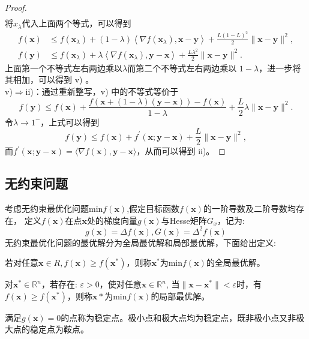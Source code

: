 \begin{proof}
\begin{equation}
\begin{array}{l}
\end{array}
    \nonumber
\end{equation}
将$x_{\lambda}  $代入上面两个等式，可以得到
\begin{equation}
\begin{array}{c}
f(\bm{x}) &\leq f\left(\bm{x}_{\lambda}\right)+(1-\lambda)\left\langle\nabla f\left(\bm{x}_{\lambda}\right), \bm{x}-\bm{y}\right\rangle+\frac{L(1-L)^{2}}{2}\|\bm{x}-\bm{y}\|^{2} , \\
f(\bm{y}) &\leq f\left(\bm{x}_{\lambda}\right)+\lambda\left\langle\nabla f\left(\bm{x}_{\lambda}\right), \bm{y}-\bm{x}\right\rangle+\frac{L \lambda^{2}}{2}\|\bm{x}-\bm{y}\|^{2} .
\end{array}
    \nonumber
\end{equation}
上面第一个不等式左右两边乘以$  \lambda  $而第二个不等式左右两边乘以  $1-\lambda $，进一步将其相加，可以得到 v)  。\\
v)$ \Rightarrow $ii)：通过重新整写，v) 中的不等式等价于
\begin{equation}
f(\bm{y}) \leq f(\bm{x})+\frac{f(\bm{x}+(1-\lambda)(\bm{y}-\bm{x}))-f(\bm{x})}{1-\lambda}+\frac{L}{2} \lambda\|\bm{x}-\bm{y}\|^{2} .
    \nonumber
\end{equation}
令$  \lambda \rightarrow 1^{-} $，上式可以得到
\begin{equation}
f(\bm{y}) \leq f(\bm{x})+f^{\prime}(\bm{x} ; \bm{y}-\bm{x})+\frac{L}{2}\|\bm{x}-\bm{y}\|^{2},
    \nonumber
\end{equation}
而$  f^{\prime}(\bm{x} ; \bm{y}-\bm{x})=\langle\nabla f(\bm{x}), \bm{y}-\bm{x}\rangle $，从而可以得到 ii)。
\end{proof}

\subsection{无约束问题}
考虑无约束最优化问题min$f(\bm{x})$,假定目标函数$f(\bm{x})$的一阶导数及二阶导数均存在，
定义$f(\bm{x})$在点$\bm{x}$处的梯度向量$g(\bm{x})$与Hesse矩阵$G_x$，记为:
\begin{equation}
    g(\bm{x})=\Delta f(\bm{x}), G(\bm{x})= \Delta^2f(\bm{x})    
\end{equation}
无约束最优化问题的最优解分为全局最优解和局部最优解，下面给出定义:
\begin{definition}[全局最优解]
    若对任意$\bm{x}\in R,f(\bm{x}) \geq f(\bm{x}^{*})$，则称$\bm{x}^*$为min$f(\bm{x})$的全局最优解。
\end{definition}
\begin{definition}[局部最优解]
    对$\bm{x}^*\in\mathbb{R}^{n}$，若存在: $\varepsilon >0$，使对任意$\bm{x} \in\mathbb{R}^{n}$, 
    当$\|\bm{x}-\bm{x}^*\| < \varepsilon$时，有$f(\bm{x}) ≥ f(\bm{x}^*)$，则称$\bm{x}*$为min$f(\bm{x})$的局部最优解。
\end{definition}
\begin{definition}[稳定点]
    满足$g(\bm{x})= 0$的点称为稳定点。极小点和极大点均为稳定点，既非极小点又非极大点的稳定点为鞍点。
\end{definition}

